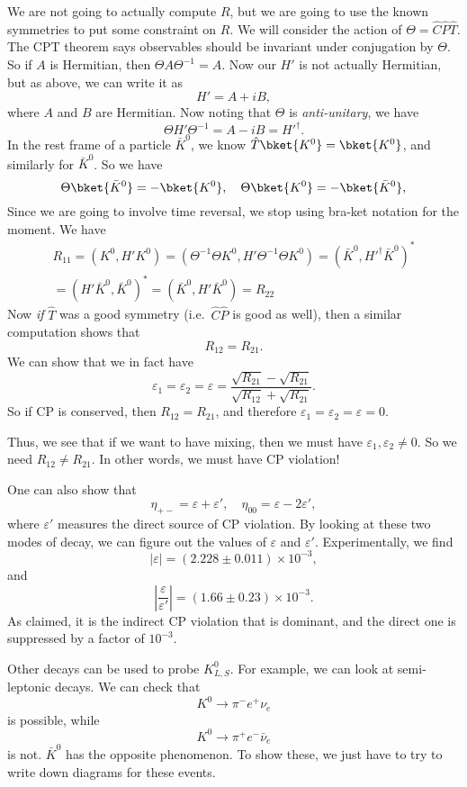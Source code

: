 \documentclass[a4paper]{article}
\begin{document}
We are not going to actually compute $R$, but we are going to use the known symmetries to put some constraint on $R$. We will consider the action of $\Theta = \hat{C}\hat{P}\hat{T}$. The CPT theorem says observables should be invariant under conjugation by $\Theta$. So if $A$ is Hermitian, then $\Theta A \Theta^{-1} = A$. Now our $H'$ is not actually Hermitian, but as above, we can write it as
\[
  H' = A + i B,
\]
where $A$ and $B$ are Hermitian. Now noting that $\Theta$ is \emph{anti-unitary}, we have
\[
  \Theta H' \Theta^{-1} = A - iB = H'^\dagger.
\]
In the rest frame of a particle $\bar{K}^0$, we know $\hat{T} \bket{K^0} = \bket{K^0}$, and similarly for $\bar{K}^0$. So we have
\[
  \Theta \bket{\bar{K}^0} = - \bket{K^0},\quad \Theta \bket{K^0} = - \bket{\bar{K}^0},
\]
Since we are going to involve time reversal, we stop using bra-ket notation for the moment. We have
\begin{multline*}
  R_{11} = (K^0, H' K^0)
  = (\Theta^{-1}\Theta K^0, H' \Theta^{-1}\Theta K^0)
  = (\bar{K}^0, H'^\dagger \bar{K}^0)^*\\
  = (H' \bar{K}^0, \bar{K}^0)^*
  = (\bar K^0, H' \bar{K}^0)
  = R_{22}
\end{multline*}
Now \emph{if} $\hat{T}$ was a good symmetry (i.e.\ $\hat{C}\hat{P}$ is good as well), then a similar computation shows that
\[
  R_{12} = R_{21}.
\]
We can show that we in fact have %
\[
  \varepsilon_1 = \varepsilon_2 = \varepsilon = \frac{\sqrt{R_{21}} - \sqrt{R_{21}}}{\sqrt{R_{12}} + \sqrt{R_{21}}}.
\]
So if CP is conserved, then $R_{12} = R_{21}$, and therefore $\varepsilon_1 = \varepsilon_2 = \varepsilon = 0$.

Thus, we see that if we want to have mixing, then we must have $\varepsilon_1, \varepsilon_2 \not= 0$. So we need $R_{12} \not =R_{21}$. In other words, we must have CP violation!

One can also show that
\[
  \eta_{+-} = \varepsilon + \varepsilon',\quad \eta_{00} = \varepsilon - 2 \varepsilon',
\]
where $\varepsilon'$ measures the direct source of CP violation. By looking at these two modes of decay, we can figure out the values of $\varepsilon$ and $\varepsilon'$. Experimentally, we find
\[
  |\varepsilon| = (2.228 \pm 0.011) \times 10^{-3},
\]
and
\[
  \left|\frac{\varepsilon}{\varepsilon'}\right| = (1.66 \pm 0.23) \times 10^{-3}.
\]
As claimed, it is the indirect CP violation that is dominant, and the direct one is suppressed by a factor of $10^{-3}$.

Other decays can be used to probe $K_{L, S}^0$. For example, we can look at semi-leptonic decays. We can check that
\[
  K^0 \to \pi^- e^+ \nu_e
\]
is possible, while
\[
  K^0 \to \pi^+ e^- \bar{\nu}_e
\]
is not. $\bar{K}^0$ has the opposite phenomenon. To show these, we just have to try to write down diagrams for these events. %
\end{document}
